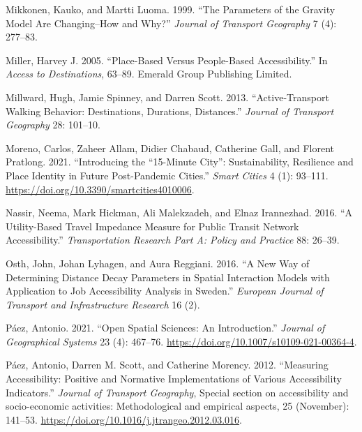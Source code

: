 \documentclass[preprint, 3p,
authoryear]{elsarticle} %
\newlength{\cslhangindent}
\newlength{\cslentryspacingunit} %
\newenvironment{CSLReferences}[2] %
 {%
  \setlength{\parindent}{0pt}
  \ifodd #1
  \let\oldpar\par
  \def\par{\hangindent=\cslhangindent\oldpar}
  \fi
  \setlength{\parskip}{#2\cslentryspacingunit}
 }%
 {}
\begin{document}
\begin{CSLReferences}{1}{0}
\leavevmode{}%
Mikkonen, Kauko, and Martti Luoma. 1999. {``The Parameters of the
Gravity Model Are Changing--How and Why?''} \emph{Journal of Transport
Geography} 7 (4): 277--83.

\leavevmode{}%
Miller, Harvey J. 2005. {``Place-Based Versus People-Based
Accessibility.''} In \emph{Access to Destinations}, 63--89. Emerald
Group Publishing Limited.

\leavevmode{}%
Millward, Hugh, Jamie Spinney, and Darren Scott. 2013.
{``Active-Transport Walking Behavior: Destinations, Durations,
Distances.''} \emph{Journal of Transport Geography} 28: 101--10.

\leavevmode{}%
Moreno, Carlos, Zaheer Allam, Didier Chabaud, Catherine Gall, and
Florent Pratlong. 2021. {``Introducing the {``}15-Minute City{''}:
Sustainability, Resilience and Place Identity in Future Post-Pandemic
Cities.''} \emph{Smart Cities} 4 (1): 93--111.
\url{https://doi.org/10.3390/smartcities4010006}.

\leavevmode{}%
Nassir, Neema, Mark Hickman, Ali Malekzadeh, and Elnaz Irannezhad. 2016.
{``A Utility-Based Travel Impedance Measure for Public Transit Network
Accessibility.''} \emph{Transportation Research Part A: Policy and
Practice} 88: 26--39.

\leavevmode{}%
Osth, John, Johan Lyhagen, and Aura Reggiani. 2016. {``A New Way of
Determining Distance Decay Parameters in Spatial Interaction Models with
Application to Job Accessibility Analysis in Sweden.''} \emph{European
Journal of Transport and Infrastructure Research} 16 (2).

\leavevmode{}%
Páez, Antonio. 2021. {``Open Spatial Sciences: An Introduction.''}
\emph{Journal of Geographical Systems} 23 (4): 467--76.
\url{https://doi.org/10.1007/s10109-021-00364-4}.

\leavevmode{}%
Páez, Antonio, Darren M. Scott, and Catherine Morency. 2012.
{``Measuring Accessibility: Positive and Normative Implementations of
Various Accessibility Indicators.''} \emph{Journal of Transport
Geography}, Special section on accessibility and socio-economic
activities: Methodological and empirical aspects, 25 (November):
141--53. \url{https://doi.org/10.1016/j.jtrangeo.2012.03.016}.


\end{CSLReferences}
\end{document}
